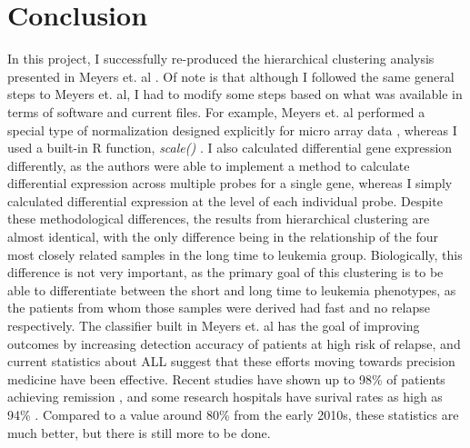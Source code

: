 \documentclass{article}
\begin{document}
\section{Conclusion}
In this project, I successfully re-produced the hierarchical clustering analysis presented in Meyers et. al \cite{data}. Of note is that although I followed the same general steps to Meyers et. al, I had to modify some steps based on what was available in terms of software and current files. For example, Meyers et. al performed a special type of normalization designed explicitly for micro array data \cite{special_normalize}, whereas I used a built-in R function, \textit{scale()} \cite{scale}. I also calculated differential gene expression differently, as the authors were able to implement a method to calculate differential expression across multiple probes for a single gene, whereas I simply calculated differential expression at the level of each individual probe. Despite these methodological differences, the results from hierarchical clustering are almost identical, with the only difference being in the relationship of the four most closely related samples in the long time to leukemia group. Biologically, this difference is not very important, as the primary goal of this clustering is to be able to differentiate between the short and long time to leukemia phenotypes, as the patients from whom those samples were derived had fast and no relapse respectively. The classifier built in Meyers et. al has the goal of improving outcomes by increasing detection accuracy of patients at high risk of relapse, and current statistics about ALL suggest that these efforts moving towards precision medicine have been effective. Recent studies have shown up to 98\% of patients achieving remission \cite{pdq}, and some research hospitals have surival rates as high as 94\% \cite{st.judes}. Compared to a value around 80\% from the early 2010s, these statistics are much better, but there is still more to be done. 
\\
\end{document}
